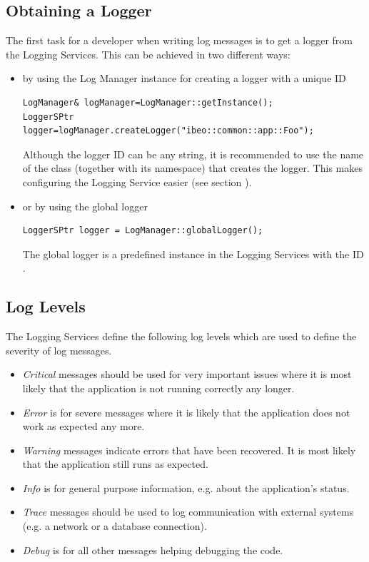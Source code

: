 \subsection{Obtaining a Logger} \label{sec:obtainingalogger}
The first task for a developer when writing log messages is to get a logger from the Logging Services. This can be achieved in two different ways:
\begin{itemize}
\item by using the Log Manager instance for creating a logger with a unique ID
\begin{lstlisting}[numbers=none]
LogManager& logManager=LogManager::getInstance();
LoggerSPtr logger=logManager.createLogger("ibeo::common::app::Foo");
\end{lstlisting}
Although the logger ID can be any string, it is recommended to use the name of the class (together with its namespace) that creates the logger. This makes configuring the Logging Service easier (see section ).

\item or by using the global logger 
\begin{lstlisting}[numbers=none]
LoggerSPtr logger = LogManager::globalLogger();
\end{lstlisting}
The global logger is a predefined instance in the Logging Services with the ID\\ .
\end{itemize}
 

\subsection{Log Levels}\label{sec:loglevel}
The Logging Services define the following log levels which are used to define the severity of log messages.
\begin{itemize}
	\item \textit{Critical} messages should be used for very important issues where it is most likely that the application is not running correctly any longer.
	\item \textit{Error} is for severe messages where it is likely that the application does not work as expected any more.
	\item \textit{Warning} messages indicate errors that have been recovered. It is most likely that the application still runs as expected.
	\item \textit{Info} is for general purpose information, e.g. about the application's status.
	\item \textit{Trace} messages should be used to log communication with external systems (e.g. a network or a database connection).
	\item \textit{Debug} is for all other messages helping debugging the code.
\end{itemize}

